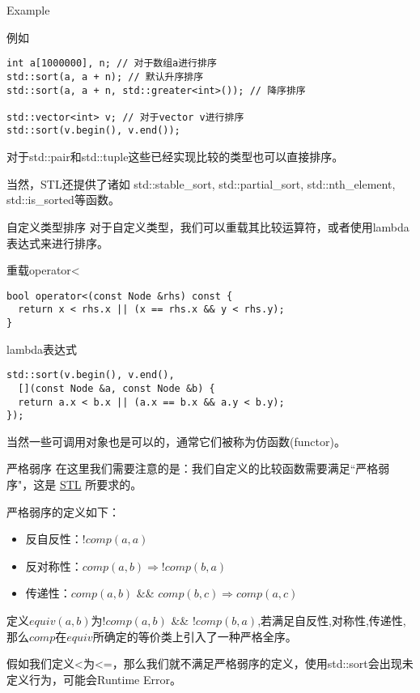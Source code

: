 \documentclass{ldr-simple-gray}
\begin{document}
  \begin{frame}[fragile]{Example}
    \begin{block}{例如}
      \begin{verbatim}
int a[1000000], n; // 对于数组a进行排序
std::sort(a, a + n); // 默认升序排序
std::sort(a, a + n, std::greater<int>()); // 降序排序

std::vector<int> v; // 对于vector v进行排序
std::sort(v.begin(), v.end());\end{verbatim}
    \end{block}
    对于std::pair和std::tuple这些已经实现比较的类型也可以直接排序。
    \newline

    当然，STL还提供了诸如 std::stable\_sort, std::partial\_sort, std::nth\_element, std::is\_sorted等函数。
  \end{frame}

  \begin{frame}[fragile]{自定义类型排序}
    对于自定义类型，我们可以重载其比较运算符，或者使用lambda表达式来进行排序。
    \begin{block}{重载operator<}
      \begin{verbatim}
bool operator<(const Node &rhs) const {
  return x < rhs.x || (x == rhs.x && y < rhs.y);
}\end{verbatim}
    \end{block}
    \begin{block}{lambda表达式}
      \begin{verbatim}
std::sort(v.begin(), v.end(),
  [](const Node &a, const Node &b) {
  return a.x < b.x || (a.x == b.x && a.y < b.y);
});\end{verbatim}
    \end{block}
    
    当然一些可调用对象也是可以的，通常它们被称为仿函数(functor)。
  \end{frame}

  \begin{frame}{严格弱序}
    在这里我们需要注意的是：我们自定义的比较函数需要满足``严格弱序"，这是 \href{https://zh.cppreference.com/w/cpp/named_req/Compare}{STL} 所要求的。\newline

    严格弱序的定义如下：
    \begin{itemize}
      \item 反自反性：$!comp(a, a)$
      \item 反对称性：$comp(a, b) \Rightarrow !comp(b, a)$
      \item 传递性：$comp(a, b)$ \&\& $comp(b, c) \Rightarrow comp(a, c)$
    \end{itemize}

    定义$equiv(a, b)$为$!comp(a, b)$ \&\& $!comp(b, a)$,若满足自反性,对称性,传递性,那么$comp$在$equiv$所确定的等价类上引入了一种严格全序。\newline

    假如我们定义<为<=，那么我们就不满足严格弱序的定义，使用std::sort会出现未定义行为，可能会Runtime Error。
  \end{frame}
\end{document}
